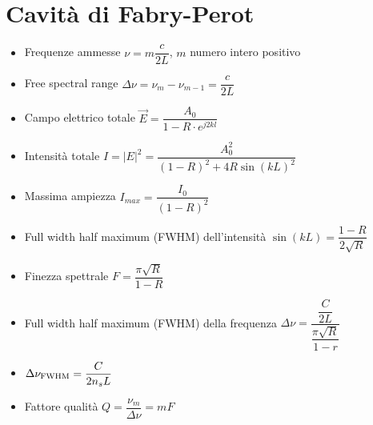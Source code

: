 \documentclass{article}
\begin{document}
\section {Cavità di Fabry-Perot}
\begin{itemize}
  \item Frequenze ammesse \(  \nu = m \dfrac{c}{2L} \), \( m \) numero intero positivo
  \item Free spectral range \( \Delta \nu = \nu_{m} - \nu_{m-1} = \dfrac{c}{2L} \)
  \item Campo elettrico totale \( \vec{E} = \dfrac{A_0}{1-R \cdot e^ {j 2 k l}} \)
  \item Intensità totale \( I = | E | ^ 2 = \dfrac{A_0^2}{(1-R)^2+ 4 R \sin(kL)^2} \)
  \item Massima ampiezza \( I_{max} = \dfrac{I_0}{(1-R)^2} \)
  \item Full width half maximum (FWHM) dell'intensità \( \sin(k L) = \dfrac{1 - R}{2 \sqrt{R}} \)
  \item Finezza spettrale \( F = \dfrac{\pi \sqrt{R}}{1-R} \)
  \item Full width half maximum (FWHM) della frequenza \( \Delta \nu  = \dfrac{\dfrac{C}{2L}}{\dfrac{\pi \sqrt{R}}{1 - r}} \)
  \item \( \Delta \nu _ {\textnormal{FWHM}} = \dfrac{C}{2 n_s L} \)
  \item Fattore qualità \( Q = \dfrac{\nu_m}{\Delta \nu} = m F \)
\end{itemize}

\newpage
\end{document}
